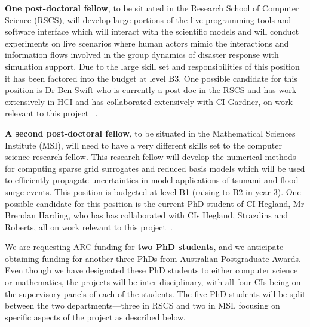 \iffalse
Both Dr Jakeman and Dr Debusschere
have offered to host visits from our group to the Livermore and
Albuquerque Sandia Laboratories. We plan to support reciprocal visits
to ANU.
\fi

{\bf One post-doctoral fellow}, to be situated in the Research School
of Computer Science (RSCS), will develop large portions of the live
programming tools and software interface which will interact with the
scientific models and will conduct experiments on live scenarios where
human actors mimic the interactions and information flows involved in
the group dynamics of disaster response with simulation support. Due
to the large skill set and responsibilities of this position it has
been factored into the budget at level B3.  One possible candidate for
this position is Dr Ben Swift who is currently a post doc in the RSCS
and has work extensively in HCI and has collaborated extensively with
CI Gardner, on work relevant to this project
~\parencite{martin2015tracking,martin2016intelligent,swiftLive2016,
  swift2013visual,swift2014coding}.

{\bf A second post-doctoral fellow}, to be situated in the
Mathematical Sciences Institute (MSI), will need to have a very
different skills set to the computer science research fellow. This
research fellow will develop the numerical methods for computing
sparse grid surrogates and reduced basis models which will be used to
efficiently propagate uncertainties in model applications of tsunami
and flood surge events. This position is budgeted at level B1 (raising
to B2 in year 3).  One possible candidate for this position is the
current PhD student of CI Hegland, Mr Brendan Harding, who has has
collaborated with CIs Hegland, Strazdins and Roberts, all on work
relevant to this project~\parencite{Ali11022016, AliEtal2015,
  deBaarHarding2015, HardingHLS2015, StrazdinsEtal2015}.


We are requesting ARC funding for {\bf two PhD students}, and we anticipate
obtaining funding for another three PhDs from Australian Postgraduate
Awards. Even though we have designated these PhD students to either
computer science or mathematics, the projects will be
inter-disciplinary, with all four CIs being on the supervisory panels
of each of the students. The five PhD students will be split between
the two departments—three in RSCS and two in MSI, focusing on specific
aspects of the project as described below.

\iffalse
. In RSCS, these will be the dynamic distributed
computing infrastructure and the development of live interfaces for
data visualisation. In the MSI, these will be the uncertainty
quantification and the development of numerical methods for the sparse
grid technique, and the reduced basis method, applied to our
inundation model example. 
\fi

